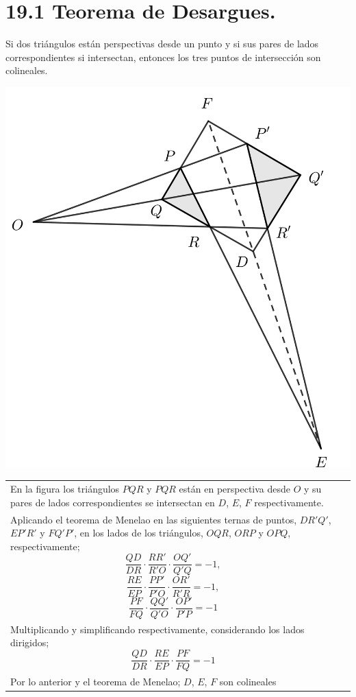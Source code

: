 \documentclass[12pt,a4paper, oneside]{book}
\begin{document}
\section{19.1 Teorema de Desargues.}
Si dos triángulos están perspectivas desde un punto y si sus pares de lados correspondientes si intersectan, entonces los tres puntos de intersección son colineales.
\\
\begin{center}
\includegraphics[scale=0.5]{Imagenes/desargue.png} 
\end{center}
\begin{tabular}{p{15.9 cm} p{1cm}}
En la figura los triángulos $PQR$ y $PQR$ están en perspectiva desde $O$ y su pares de lados correspondientes se intersectan en $D$, $E$, $F$ respectivamente.\\Aplicando el teorema de Menelao en las siguientes ternas de puntos, $DR'Q'$, $EP'R'$ y $FQ'P'$, en los lados de los triángulos, $OQR$, $ORP$ y $OPQ$, respectivamente; 
$$\dfrac{QD}{DR}\cdot\dfrac{RR'}{R'O}\cdot\dfrac{OQ'}{Q'Q}=-1,$$ 
$$\dfrac{RE}{EP}\cdot\dfrac{PP'}{P'O}\cdot \dfrac{OR'}{R'R}=-1,$$ $$\dfrac{PF}{FQ}\cdot\dfrac{QQ'}{Q'O}\cdot\dfrac{OP'}{P'P}=-1$$
\\Multiplicando y simplificando respectivamente, considerando los lados dirigidos; $$\dfrac{QD}{DR}\cdot \dfrac{RE}{EP}\cdot \dfrac{PF}{FQ}=-1$$ 
\\Por lo anterior y el teorema de Menelao; $D$, $E$, $F$ son colineales
\end{tabular}
\end{document}
